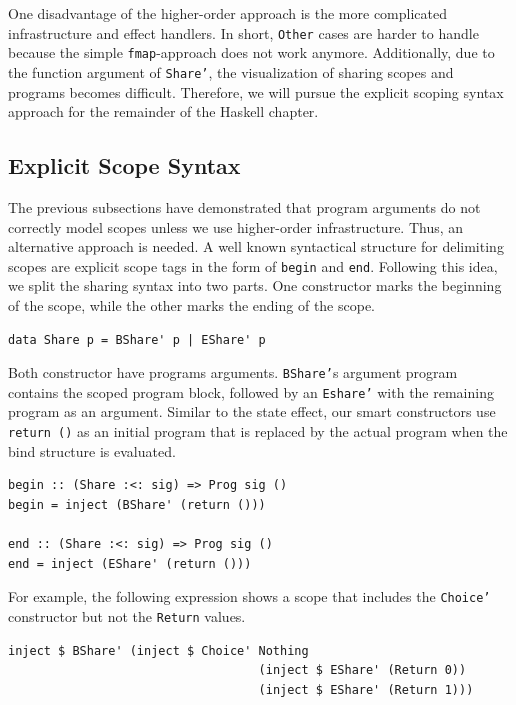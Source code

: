 \documentclass[a4paper, 11pt, fleqn, twoside]{scrreprt}
\newcommand{\hinl}[1]{\texttt{#1}}
\begin{document}
One disadvantage of the higher-order approach is the more complicated infrastructure and effect handlers.
In short, \hinl{Other} cases are harder to handle because the simple \hinl{fmap}-approach does not work anymore.
Additionally, due to the function argument of \hinl{Share'}, the visualization of sharing scopes and programs becomes difficult.
Therefore, we will pursue the explicit scoping syntax approach for the remainder of the Haskell chapter.

\subsection{Explicit Scope Syntax}
\label{subsec:explicit}
The previous subsections have demonstrated that program arguments do not correctly model scopes unless we use higher-order infrastructure.
Thus, an alternative approach is needed.
A well known syntactical structure for delimiting scopes are explicit scope tags in the form of \hinl{begin} and \hinl{end}.
Following this idea, we split the sharing syntax into two parts.
One constructor marks the beginning of the scope, while the other marks the ending of the scope.

\begin{verbatim}
data Share p = BShare' p | EShare' p
\end{verbatim}

Both constructor have programs arguments.
\hinl{BShare'}s argument program contains the scoped program block, followed by an \hinl{Eshare'} with the remaining program as an argument.
Similar to the state effect, our smart constructors use \hinl{return ()} as an initial program that is replaced by the actual program when the bind structure is evaluated.

\begin{verbatim}
begin :: (Share :<: sig) => Prog sig ()
begin = inject (BShare' (return ()))

end :: (Share :<: sig) => Prog sig ()
end = inject (EShare' (return ()))
\end{verbatim}

For example, the following expression shows a scope that includes the \hinl{Choice'} constructor but not the \hinl{Return} values.

\begin{verbatim}
inject $ BShare' (inject $ Choice' Nothing 
                                   (inject $ EShare' (Return 0))
                                   (inject $ EShare' (Return 1)))
\end{verbatim}
\end{document}
